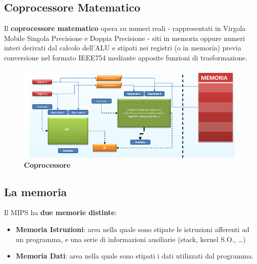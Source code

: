 \documentclass[12pt]{article} %
\begin{document}
\subsection{Coprocessore Matematico}
Il \textbf{coprocessore matematico} opera su numeri reali - rappresentati in Virgola Mobile Singola Precisione e Doppia Precisione - siti in memoria oppure numeri interi derivati dal calcolo dell’ALU e stipati nei registri (o in memoria) previa conversione nel formato IEEE754 mediante apposite funzioni di trasformazione.\par\medskip\noindent
\begin{figure}[h]
\centering
\includegraphics[width=1\linewidth]{coprocessore.png}
\caption{\textbf{Coprocessore}}
\label{fig:enter-label}
\end{figure}
\subsection{La memoria}
Il MIPS ha \textbf{due memorie distinte}:
\begin{itemize}
\item \textbf{Memoria Istruzioni}: area nella quale sono stipate le istruzioni afferenti ad un programma, e una serie di informazioni ausiliarie (stack, kernel S.O., …) 
\item \textbf{Memoria Dati}: area nella quale sono stipati i dati utilizzati dal programma.\par\medskip\noindent
\end{itemize}
\end{document}
